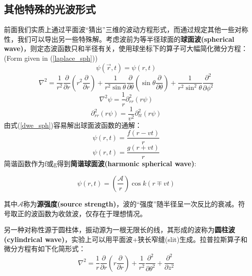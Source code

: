 \documentclass[12pt]{ctexart}%
\begin{document}
\subsection*{其他特殊的光波形式}
\par 前面我们实质上通过平面波“猜出”三维的波动方程形式，而通过规定其他一些对称性，我们可以导出另一些特殊解。考虑波前为等半径球面的\textbf{球面波(spherical wave)}，则定态波函数只和半径有关，使用球坐标下的算子可大幅简化微分方程：(Form given in (\ref{laplace_sph}))
\begin{equation}
    \psi(\vec{r},t)=\psi(r,t)
\end{equation}
\begin{equation}
    \nabla^{2}= \frac{1}{r^{2}} \frac{\partial}{\partial r}\left(r^{2} \frac{\partial}{\partial r}\right)+\frac{1}{r^{2} \sin \theta} \frac{\partial}{\partial \theta}\left(\sin \theta \frac{\partial}{\partial \theta}\right)+\frac{1}{r^{2} \sin ^{2} \theta} \frac{\partial^{2}}{\partial \phi^{2}}
    \label{laplace_sph}
\end{equation}
\begin{equation}
    \nabla^2\psi=\frac{1}{r}\partial^2_{rr}(r\psi)
\end{equation}
\begin{equation}
    \partial^2_{rr}(r\psi)=\frac{1}{v^2}\partial^2_{tt}(r\psi)
    \label{dwe_sph}
\end{equation}
由式(\ref{dwe_sph})容易解出球面波函数的通解：
\begin{equation}
    \psi(r,t)=\frac{f(r-vt)}{r}
\end{equation}
\begin{equation}
    \psi(r,t)=\frac{g(r+vt)}{r}
\end{equation}
简谐函数作为f或g得到\textbf{简谐球面波(harmonic spherical wave)}:
\begin{framed}
    \begin{equation}
        \psi(r,t)=\left(\frac{\mathscr{A}}{r}\right)\cos{k(r\mp vt)}
    \end{equation}
\end{framed}
其中$\mathscr{A}$称为\textbf{源强度(source strength)}，波的“强度”随半径呈一次反比的衰减。符号取正的波函数为收敛波，仅存在于理想情况。
\par 另一种对称性源于圆柱体，振动源为一根无限长的线，其形成的波称为\textbf{圆柱波(cylindrical wave)}，实验上可以用平面波+狭长窄缝(slit)生成。拉普拉斯算子和微分方程有如下化简形式：
\begin{equation}
    \nabla^{2}= \frac{1}{r} \frac{\partial}{\partial r}\left(r \frac{\partial}{\partial r}\right)+\frac{1}{r^{2} } \frac{\partial^2}{\partial \theta^2}+\frac{\partial^{2}}{\partial z^{2}}
    \label{laplace_cyl}
\end{equation}
\end{document}
